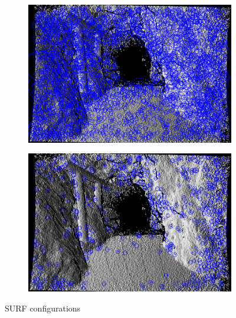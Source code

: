 \begin{figure}[H]
\begin{subfigure}[t]{0.25\linewidth}
\end{subfigure}%
\begin{subfigure}[t]{0.25\linewidth}
    \includegraphics[width=\linewidth]{chapter06/results/SURF/bearing/default_kp0005.png}%
\end{subfigure}%
\begin{subfigure}[t]{0.25\linewidth}
    \includegraphics[width=\linewidth]{chapter06/results/SURF/bearing/oneoctave_kp0005.png}%
\end{subfigure}%
\caption{SURF configurations}
\end{figure}


